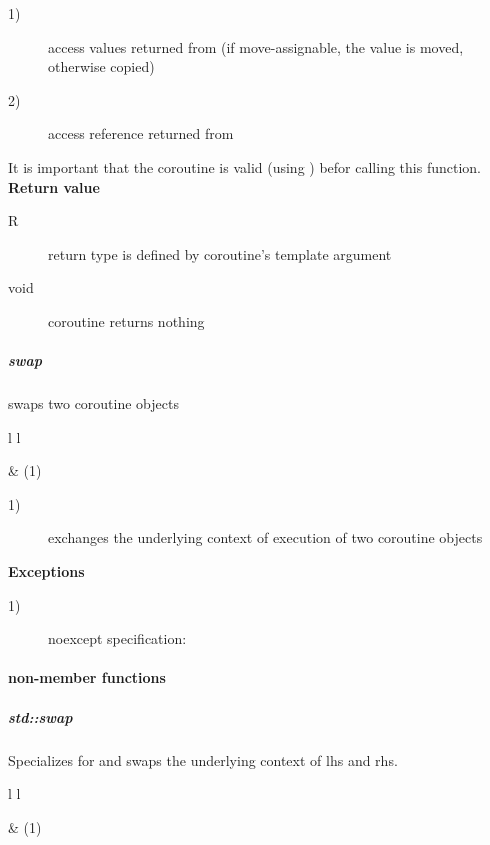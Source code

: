 \begin{description}
    \item[1)] access values returned from \corofunction (if move-assignable, the
              value is moved, otherwise copied)
    \item[2)] access reference returned from \corofunction
\end{description}
It is important that the coroutine is valid (using ) befor
calling this function.\\

{\bf Return value}
\begin{description}
    \item[R] return type is defined by coroutine's template argument
    \item[void] coroutine returns nothing
\end{description}

\subparagraph*{swap}
swaps two coroutine objects\\

\begin{tabular}{ l l }
    \midrule

     & (1)\\

    \midrule
\end{tabular}

\begin{description}
    \item[1)] exchanges the underlying context of execution of two coroutine
              objects
\end{description}

{\bf Exceptions}
\begin{description}
    \item[1)] noexcept specification: 
\end{description}

\paragraph*{non-member functions}
\subparagraph*{std::swap}
Specializes  for \pullcoro and swaps the underlying context of
lhs and rhs.

\begin{tabular}{ l l }
    \midrule

     & (1)\\

    \midrule
\end{tabular}

